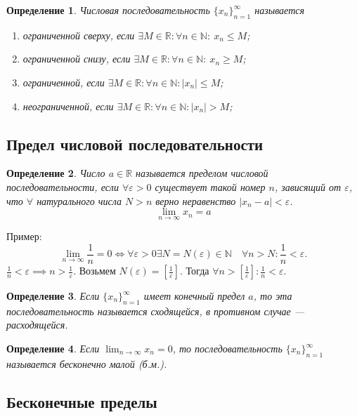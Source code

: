 \documentclass[a4paper,12pt]{article} %
\newtheorem{definition}{Определение}[section]
\theoremstyle{remark}
\theoremstyle{definition}
\begin{document}
\begin{definition}
	Числовая последовательность $\{x_n\}_{n=1}^\infty$ называется 

	\begin{enumerate}
		\item ограниченной сверху, если $\exists M\in \mathbb{R}: \forall n\in \mathbb{N}: \ x_n\le M$;
		\item ограниченной снизу, если \space $\exists M\in \mathbb{R}: \forall n\in \mathbb{N}: \ x_n\ge M$;
		\item ограниченной, если \space\space\space\space\space\space\space\space\space $\exists M\in \mathbb{R}: \forall n\in \mathbb{N}:|x_n| \le M$;
		\item неограниченной, если \space\space\space\space\space\space $\exists M\in \mathbb{R}: \forall n\in \mathbb{N}:|x_n|> M$;
	\end{enumerate}
\end{definition}



\subsection{Предел числовой последовательности}
\begin{definition}
	Число $a\in\mathbb{R}$ называется пределом числовой последовательности, если $\forall \varepsilon>0$ существует такой номер $n$, зависящий от $\varepsilon$, что $\forall$ натурального числа $N>n$ верно неравенство $|x_n - a| < \varepsilon$.
	$$\lim_{n\to\infty} x_n = a$$
\end{definition}
\noindent Пример:
\[
\lim_{n \to \infty} \frac{1}{n} = 0 \iff \forall \varepsilon>0 \exists N=N(\varepsilon) \in \mathbb{N} \quad \forall n>N : \frac{1}{n} < \varepsilon
.\] 
$\frac{1}{n} < \varepsilon \implies n > \frac{1}{\varepsilon}$. Возьмем $N(\varepsilon) = [\frac{1}{\varepsilon}]$. Тогда $\forall n>[\frac{1}{\varepsilon}] : \frac{1}{n} < \varepsilon.$


\begin{definition}
	Если $\{x_n\}_{n=1}^{\infty}$ имеет конечный предел $a$, то эта последовательность называется сходящейся, в противном случае --- расходящейся.
\end{definition}

\begin{definition}
	Если $\lim_{n \to \infty} x_n = 0$, то последовательность $\{x_n\}_{n=1}^{\infty}$ называется бесконечно малой (б.м.).
\end{definition}
\subsection{Бесконечные пределы}
\end{document}
